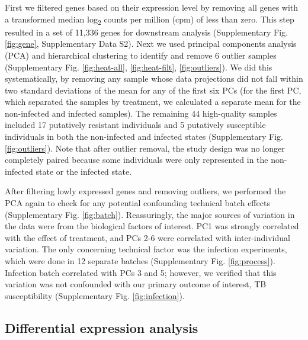 \documentclass[fleqn,10pt]{wlscirep}
\begin{document}
First we filtered genes based on their expression level by removing
all genes with a transformed median log\textsubscript{2} counts per
million (cpm) of less than zero. This step resulted in a set of 11,336
genes for downstream analysis (Supplementary Fig. \ref{fig:gene},
Supplementary Data S2). Next we used principal components analysis
(PCA) and hierarchical clustering to identify and remove 6 outlier
samples (Supplementary Fig. \ref{fig:heat-all}, \ref{fig:heat-filt},
\ref{fig:outliers}). We did this systematically, by removing any
sample whose data projections did not fall within two standard
deviations of the mean for any of the first six PCs (for the first PC,
which separated the samples by treatment, we calculated a separate
mean for the non-infected and infected samples). The remaining 44
high-quality samples included 17 putatively resistant individuals and
5 putatively susceptible individuals in both the non-infected and
infected states (Supplementary Fig. \ref{fig:outliers}). Note that
after outlier removal, the study design was no longer completely
paired because some individuals were only represented in the
non-infected state or the infected state.

After filtering lowly expressed genes and removing outliers, we
performed the PCA again to check for any potential confounding
technical batch effects (Supplementary Fig. \ref{fig:batch}).
Reassuringly, the major sources of variation in the data were from the
biological factors of interest. PC1 was strongly correlated with the
effect of treatment, and PCs 2-6 were correlated with inter-individual
variation. The only concerning technical factor was the infection
experiments, which were done in 12 separate batches (Supplementary
Fig. \ref{fig:process}). Infection batch correlated with PCs 3 and 5;
however, we verified that this variation was not confounded with our
primary outcome of interest, TB susceptibility (Supplementary Fig.
\ref{fig:infection}).
\subsection*{Differential expression analysis}
\end{document}
